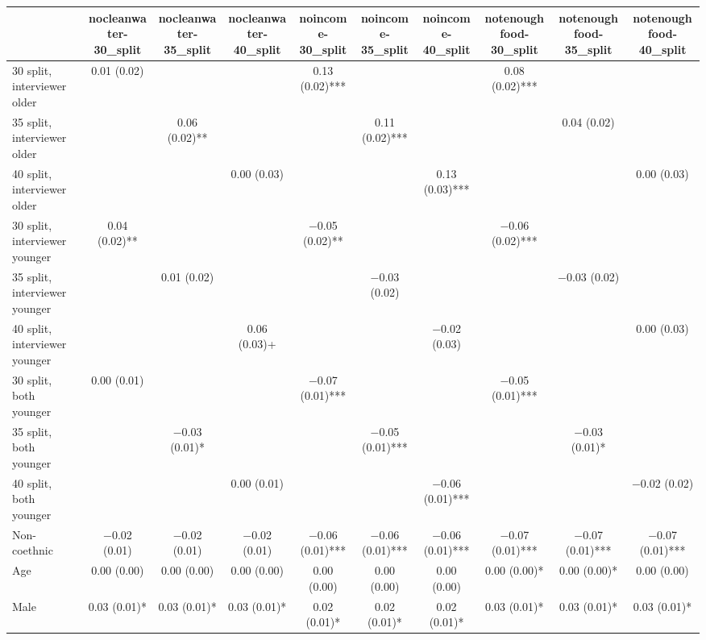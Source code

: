 \begin{table}[H]
\centering
\fontsize{7}{9}\selectfont
\begin{tabular}[t]{lccccccccc}
\toprule
  & nocleanwater-30\_split & nocleanwater-35\_split & nocleanwater-40\_split & noincome-30\_split & noincome-35\_split & noincome-40\_split & notenoughfood-30\_split & notenoughfood-35\_split & notenoughfood-40\_split\\
\midrule
30 split, interviewer older & \num{0.01} (\num{0.02}) &  &  & \num{0.13} (\num{0.02})*** &  &  & \num{0.08} (\num{0.02})*** &  & \\
35 split, interviewer older &  & \num{0.06} (\num{0.02})** &  &  & \num{0.11} (\num{0.02})*** &  &  & \num{0.04} (\num{0.02}) & \\
40 split, interviewer older &  &  & \num{0.00} (\num{0.03}) &  &  & \num{0.13} (\num{0.03})*** &  &  & \num{0.00} (\num{0.03})\\
30 split, interviewer younger & \num{0.04} (\num{0.02})** &  &  & \num{-0.05} (\num{0.02})** &  &  & \num{-0.06} (\num{0.02})*** &  & \\
35 split, interviewer younger &  & \num{0.01} (\num{0.02}) &  &  & \num{-0.03} (\num{0.02}) &  &  & \num{-0.03} (\num{0.02}) & \\
40 split, interviewer younger &  &  & \num{0.06} (\num{0.03})+ &  &  & \num{-0.02} (\num{0.03}) &  &  & \num{0.00} (\num{0.03})\\
30 split, both younger & \num{0.00} (\num{0.01}) &  &  & \num{-0.07} (\num{0.01})*** &  &  & \num{-0.05} (\num{0.01})*** &  & \\
35 split, both younger &  & \num{-0.03} (\num{0.01})* &  &  & \num{-0.05} (\num{0.01})*** &  &  & \num{-0.03} (\num{0.01})* & \\
40 split, both younger &  &  & \num{0.00} (\num{0.01}) &  &  & \num{-0.06} (\num{0.01})*** &  &  & \num{-0.02} (\num{0.02})\\
Non-coethnic & \num{-0.02} (\num{0.01}) & \num{-0.02} (\num{0.01}) & \num{-0.02} (\num{0.01}) & \num{-0.06} (\num{0.01})*** & \num{-0.06} (\num{0.01})*** & \num{-0.06} (\num{0.01})*** & \num{-0.07} (\num{0.01})*** & \num{-0.07} (\num{0.01})*** & \num{-0.07} (\num{0.01})***\\
Age & \num{0.00} (\num{0.00}) & \num{0.00} (\num{0.00}) & \num{0.00} (\num{0.00}) & \num{0.00} (\num{0.00}) & \num{0.00} (\num{0.00}) & \num{0.00} (\num{0.00}) & \num{0.00} (\num{0.00})* & \num{0.00} (\num{0.00})* & \num{0.00} (\num{0.00})\\
Male & \num{0.03} (\num{0.01})* & \num{0.03} (\num{0.01})* & \num{0.03} (\num{0.01})* & \num{0.02} (\num{0.01})* & \num{0.02} (\num{0.01})* & \num{0.02} (\num{0.01})* & \num{0.03} (\num{0.01})* & \num{0.03} (\num{0.01})* & \num{0.03} (\num{0.01})*\\

\end{tabular}
\end{table}
